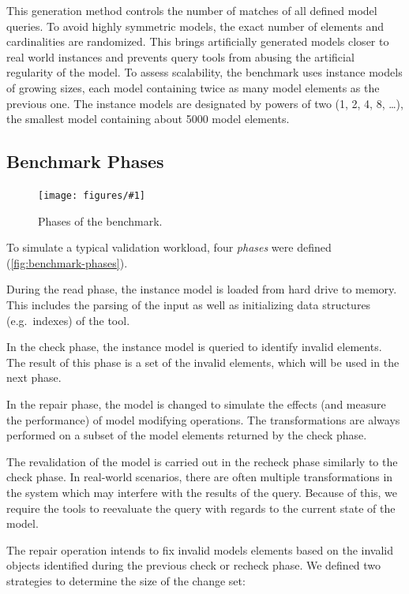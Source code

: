 \documentclass[submission,copyright,creativecommons]{eptcs}
\newcommand{\figref}[1]{\autoref{fig:#1}}
\newcommand{\ttcfig}[2]{
\begin{figure}[htb] 
	\centering
	\texttt{[image: figures/\#1]}
	\caption{#2.}
	\vspace{-1em}
	\label{fig:#1}
\end{figure}}
\begin{document}
This generation method controls the number of matches of all defined model queries. To avoid highly symmetric models, the exact number of elements and cardinalities are randomized. This brings artificially generated models closer to real world instances and prevents query tools from abusing the artificial regularity of the model.  To assess scalability, the benchmark uses instance models of growing sizes, each model containing twice as many model elements as the previous one. The instance models are designated by powers of two (1, 2, 4, 8, \ldots), the smallest model containing about 5000 model elements. 

\subsection{Benchmark Phases}
\label{sec:phases}

\ttcfig{benchmark-phases}{Phases of the benchmark}

To simulate a typical validation workload, four \emph{phases} were defined (\figref{benchmark-phases}).

\begin{compactenum}
	\item During the \textsf{read} phase, the instance model is loaded from hard drive to memory. This includes the parsing of the input as well as initializing data structures (e.g.\ indexes) of the tool.
	\item In the \textsf{check} phase, the instance model is queried to identify invalid elements. The result of this phase is a set of the invalid elements, which will be used in the next phase.
	\item In the \textsf{repair} phase, the model is changed to simulate the effects (and measure the performance) of model modifying operations. The transformations are always performed on a subset of the model elements returned by the \textsf{check} phase.
	\item The revalidation of the model is carried out in the \textsf{recheck} phase similarly to the \textsf{check} phase. In real-world scenarios, there are often multiple transformations in the system which may interfere with the results of the query. Because of this, we require the tools to reevaluate the query with regards to the current state of the model.
\end{compactenum}

The repair operation intends to fix invalid models elements based on the invalid objects identified during the previous \textsf{check} or \textsf{recheck} phase. We defined two strategies to determine the size of the change set:
\end{document}
